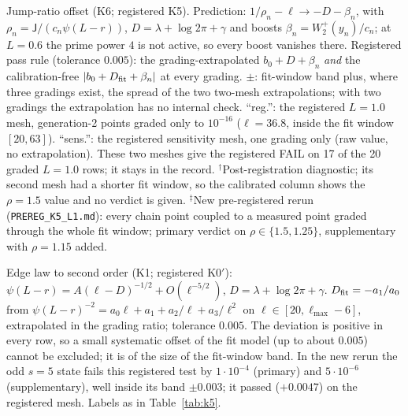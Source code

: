 \begin{table}[p]\centering\footnotesize\setlength\tabcolsep{3pt}

\caption{Jump-ratio offset (K6; registered K5). Prediction: $1/\rho_n-\ell\to-D-\beta_n$, with $\rho_n=\mathsf J/(c_n\psi(L-r))$, $D=\lambda+\log2\pi+\gamma$ and boosts $\beta_n=W_2^+(y_n)/c_n$; at $L=0.6$ the prime power $4$ is not active, so every boost vanishes there. Registered pass rule (tolerance $0.005$): the grading-extrapolated $b_0+D+\beta_n$ \emph{and} the calibration-free $|b_0+D_{\rm fit}+\beta_n|$ at every grading. $\pm$: fit-window band plus, where three gradings exist, the spread of the two two-mesh extrapolations; with two gradings the extrapolation has no internal check. ``reg.'': the registered $L=1.0$ mesh, generation-2 points graded only to $10^{-16}$ ($\ell=36.8$, inside the fit window $[20,63]$). ``sens.'': the registered sensitivity mesh, one grading only (raw value, no extrapolation). These two meshes give the registered FAIL on 17 of the 20 graded $L=1.0$ rows; it stays in the record. $^\dagger$Post-registration diagnostic; its second mesh had a shorter fit window, so the calibrated column shows the $\rho=1.5$ value and no verdict is given. $^\ddagger$New pre-registered rerun (\texttt{PREREG\_K5\_L1.md}): every chain point coupled to a measured point graded through the whole fit window; primary verdict on $\rho\in\{1.5,1.25\}$, supplementary with $\rho=1.15$ added.}\label{tab:k5}
\end{table}

\begin{table}[p]\centering\footnotesize\setlength\tabcolsep{3pt}

\caption{Edge law to second order (K1; registered K0$'$): $\psi(L-r)=A(\ell-D)^{-1/2}+O(\ell^{-5/2})$, $D=\lambda+\log2\pi+\gamma$. $D_{\rm fit}=-a_1/a_0$ from $\psi(L-r)^{-2}=a_0\ell+a_1+a_2/\ell+a_3/\ell^2$ on $\ell\in[20,\ell_{\max}-6]$, extrapolated in the grading ratio; tolerance $0.005$. The deviation is positive in every row, so a small systematic offset of the fit model (up to about $0.005$) cannot be excluded; it is of the size of the fit-window band. In the new rerun the odd $s=5$ state fails this registered test by $1\cdot10^{-4}$ (primary) and $5\cdot10^{-6}$ (supplementary), well inside its band $\pm0.003$; it passed ($+0.0047$) on the registered mesh. Labels as in Table~\ref{tab:k5}.}\label{tab:k0}
\end{table}

